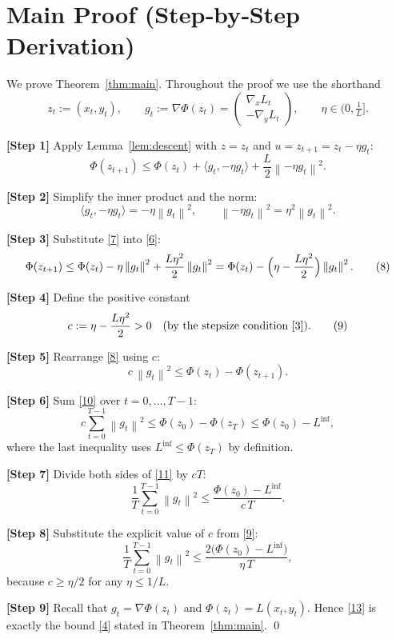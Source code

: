 \documentclass{article}
\newcommand{\norm}[1]{\left\lVert#1\right\rVert}
\newcommand{\gradx}{\nabla_{x} L}
\newcommand{\grady}{\nabla_{y} L}
\begin{document}
\section*{Main Proof (Step‑by‑Step Derivation)}
We prove Theorem~\ref{thm:main}. Throughout the proof we use the shorthand
\[
z_t:=(x_t,y_t),\qquad
g_t:=\nabla\Phi(z_t)=\begin{pmatrix}\gradx_t\\ -\grady_t\end{pmatrix},
\qquad
\eta\in\bigl(0,\tfrac{1}{L}\bigr].
\]

\noindent\textbf{[Step 1]} Apply Lemma~\ref{lem:descent} with $z=z_t$ and $u=z_{t+1}=z_t-\eta g_t$:
\[
\Phi(z_{t+1})
\le\Phi(z_t)+\langle g_t, -\eta g_t\rangle+\frac{L}{2}\norm{-\eta g_t}^{2}.
\tag{6}
\]

\noindent\textbf{[Step 2]} Simplify the inner product and the norm:
\[
\langle g_t,-\eta g_t\rangle=-\eta\norm{g_t}^{2},
\qquad
\norm{-\eta g_t}^{2}=\eta^{2}\norm{g_t}^{2}.
\tag{7}
\]

\noindent\textbf{[Step 3]} Substitute \eqref{7} into \eqref{6}:
\[
\Phi(z_{t+1})
\le\Phi(z_t)-\eta\norm{g_t}^{2}+\frac{L\eta^{2}}{2}\norm{g_t}^{2}
=\Phi(z_t)-\Bigl(\eta-\frac{L\eta^{2}}{2}\Bigr)\norm{g_t}^{2}.
\tag{8}
\]

\noindent\textbf{[Step 4]} Define the positive constant
\[
c:=\eta-\frac{L\eta^{2}}{2}>0
\quad\text{(by the stepsize condition \eqref{3})}.
\tag{9}
\]

\noindent\textbf{[Step 5]} Rearrange \eqref{8} using $c$:
\[
c\,\norm{g_t}^{2}
\le\Phi(z_t)-\Phi(z_{t+1}).
\tag{10}
\]

\noindent\textbf{[Step 6]} Sum \eqref{10} over $t=0,\dots,T-1$:
\[
c\sum_{t=0}^{T-1}\norm{g_t}^{2}
\le\Phi(z_0)-\Phi(z_T)
\le\Phi(z_0)-L^{\inf},
\tag{11}
\]
where the last inequality uses $L^{\inf}\le\Phi(z_T)$ by definition.

\noindent\textbf{[Step 7]} Divide both sides of \eqref{11} by $cT$:
\[
\frac{1}{T}\sum_{t=0}^{T-1}\norm{g_t}^{2}
\le\frac{\Phi(z_0)-L^{\inf}}{c\,T}.
\tag{12}
\]

\noindent\textbf{[Step 8]} Substitute the explicit value of $c$ from \eqref{9}:
\[
\frac{1}{T}\sum_{t=0}^{T-1}\norm{g_t}^{2}
\le\frac{2\bigl(\Phi(z_0)-L^{\inf}\bigr)}{\eta\,T},
\tag{13}
\]
because $c\ge\eta/2$ for any $\eta\le1/L$.

\noindent\textbf{[Step 9]} Recall that $g_t=\nabla\Phi(z_t)$ and $\Phi(z_t)=L(x_t,y_t)$. Hence \eqref{13} is exactly the bound \eqref{4} stated in Theorem~\ref{thm:main}. \qed
\end{document}
